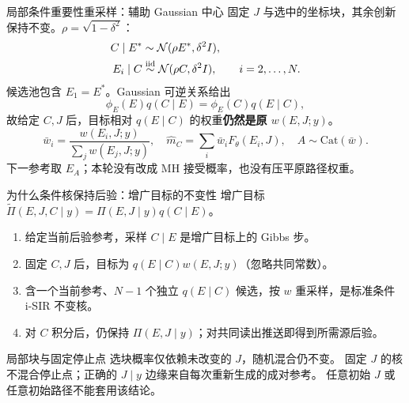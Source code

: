 \documentclass[10pt,aspectratio=169]{beamer}
\newcommand{\N}{\mathcal N}
\begin{document}
\begin{frame}{局部条件重要性重采样：辅助 Gaussian 中心}
\small
固定 $J$ 与选中的坐标块，其余创新保持不变。$\rho=\sqrt{1-\delta^2}$：
\begin{align}
C\mid E^*&\sim\N(\rho E^*,\delta^2I),\\
E_i\mid C&\overset{\rm iid}{\sim}\N(\rho C,\delta^2I),\qquad i=2,\ldots,N.
\end{align}
候选池包含 $E_1=E^*$。Gaussian 可逆关系给出
\begin{equation}
\phi_E(E)q(C\mid E)=\phi_E(C)q(E\mid C),
\end{equation}
故给定 $C,J$ 后，目标相对 $q(E\mid C)$ 的权重\textbf{仍然是原 $w(E,J;y)$}。
\begin{equation}
\bar w_i=\frac{w(E_i,J;y)}{\sum_jw(E_j,J;y)},\quad
\widehat m_C=\sum_i\bar w_iF_\theta(E_i,J),\quad A\sim\mathrm{Cat}(\bar w).
\end{equation}
下一参考取 $E_A$；本轮没有改成 MH 接受概率，也没有压平原路径权重。
\end{frame}

\begin{frame}{为什么条件核保持后验：增广目标的不变性}
\small
增广目标 $\widetilde\Pi(E,J,C\mid y)=\Pi(E,J\mid y)q(C\mid E)$。
\begin{enumerate}\itemsep5pt
\item 给定当前后验参考，采样 $C\mid E$ 是增广目标上的 Gibbs 步。
\item 固定 $C,J$ 后，目标为 $q(E\mid C)w(E,J;y)$（忽略共同常数）。
\item 含一个当前参考、$N-1$ 个独立 $q(E\mid C)$ 候选，按 $w$ 重采样，是标准条件 i-SIR 不变核。
\item 对 $C$ 积分后，仍保持 $\Pi(E,J\mid y)$；对共同读出推送即得到所需源后验。
\end{enumerate}
\begin{alertblock}{局部块与固定停止点}
选块概率仅依赖未改变的 $J$，随机混合仍不变。
固定 $J$ 的核不混合停止点；正确的 $J\mid y$ 边缘来自每次重新生成的成对参考。
任意初始 $J$ 或任意初始路径不能套用该结论。
\end{alertblock}
\end{frame}
\end{document}
